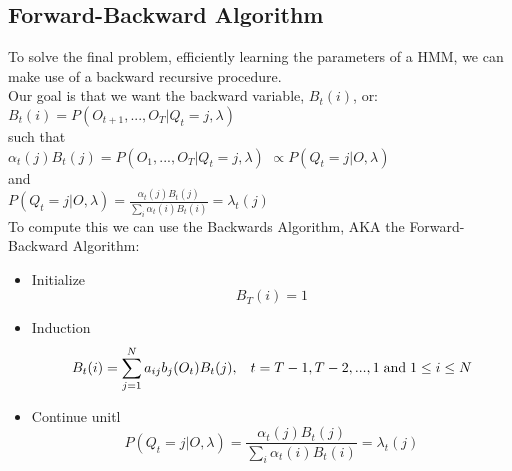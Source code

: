 \documentclass[12pt]{report}
\begin{document}
\subsection{Forward-Backward Algorithm}
To solve the final problem, efficiently learning the parameters of a HMM, we can make use of a backward recursive procedure. \\
Our goal is that we want the backward variable, $B_t(i)$, or: \\
\vspace{3 mm}
$B_t(i) = P(O_{t+1},...,O_T|Q_t=j,\lambda)$ \\
\vspace{3 mm}
such that \\ $\alpha_t(j)B_t(j) = P(O_1,...,O_T|Q_t=j,\lambda)$
$\propto P(Q_t=j|O,\lambda)$ \\
\vspace{3 mm}
and \\
\vspace{3 mm}
$P(Q_t=j|O,\lambda) = \frac{\alpha_t(j)B_t(j)}{\sum_i\alpha_t(i)B_t(i)} = \lambda_t(j)$ \\

To compute this we can use the Backwards Algorithm, AKA the Forward-Backward Algorithm:

\begin{itemize}
	\item Initialize
	\begin{equation}
	B_T(i)=1
	\end{equation}
	\item Induction
	\begin{equation}
	B_t(i) = \sum_{j=1}^Na_{ij}b_j(O_t)B_t(j), \hspace{3 mm} t=T-1, T-2,..., 1 \hspace{1 mm} \text{and} \hspace{1 mm} 1 \leq i \leq N
	\end{equation}
	\item Continue unitl
	\begin{equation}
	P(Q_t=j|O,\lambda) = \frac{\alpha_t(j)B_t(j)}{\sum_i\alpha_t(i)B_t(i)} = \lambda_t(j)
	\end{equation}
\end{itemize}
\end{document}
